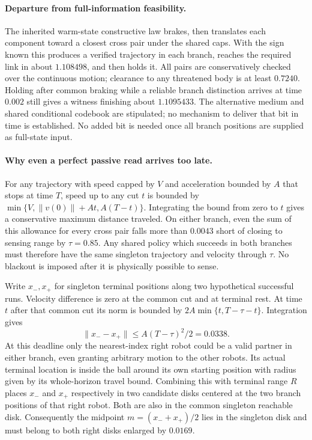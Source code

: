 \documentclass{article}
\begin{document}
\paragraph{Departure from full-information feasibility.}
The inherited warm-state constructive law brakes, then translates
each component toward a closest cross pair under the shared caps.
With the sign known this produces a verified trajectory in each
branch, reaches the required link in about $1.108498$, and then
holds it. All pairs are conservatively checked over the continuous
motion; clearance to any threatened body is at least $0.7240$.
Holding after common braking while a reliable branch distinction
arrives at time $0.002$ still gives a witness finishing about
$1.1095433$. The alternative medium and shared conditional
codebook are stipulated; no mechanism to deliver that bit in
time is established. No added bit is needed once all branch
positions are supplied as full-state input.

\paragraph{Why even a perfect passive read arrives too late.}
For any trajectory with speed capped by $V$ and acceleration
bounded by $A$ that stops at time $T$, speed up to any cut $t$
is bounded by $\min\{V,\|v(0)\|+At,A(T-t)\}$. Integrating the
bound from zero to $t$ gives a conservative maximum distance
traveled. On either branch, even the sum of this allowance for
every cross pair falls more than $0.0043$ short of closing to
sensing range by $\tau=0.85$. Any shared policy which succeeds
in both branches must therefore have the same singleton
trajectory and velocity through $\tau$. No blackout is imposed
after it is physically possible to sense.

Write $x_-,x_+$ for singleton terminal positions along two
hypothetical successful runs. Velocity difference is zero at the
common cut and at terminal rest. At time $t$ after that common
cut its norm is bounded by
$2A\min\{t,T-\tau-t\}$. Integration gives
\[
\|x_--x_+\|\leq A(T-\tau)^2/2=0.0338.
\]
At this deadline only the nearest-index right robot could be a
valid partner in either branch, even granting arbitrary motion to
the other robots. Its actual terminal location is inside the ball
around its own starting position with radius given by its
whole-horizon travel bound. Combining this with terminal range
$R$ places $x_-$ and $x_+$ respectively in two candidate disks
centered at the two branch positions of that right robot.
Both are also in the common singleton reachable disk. Consequently
the midpoint $m=(x_-+x_+)/2$ lies in the singleton disk and must
belong to both right disks enlarged by $0.0169$.
\end{document}

